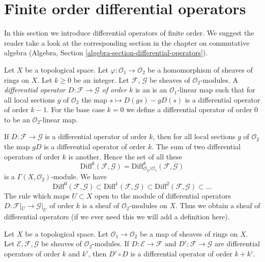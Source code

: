 \section{Finite order differential operators}
\label{section-differential-operators}

\noindent
In this section we introduce differential operators of finite order.
We suggest the reader take a look at the corresponding section
in the chapter on commutative algebra
(Algebra, Section \ref{algebra-section-differential-operators}).

\begin{definition}
\label{definition-differential-operators}
Let $X$ be a topological space. Let $\varphi : \mathcal{O}_1 \to \mathcal{O}_2$
be a homomorphism of sheaves of rings on $X$. Let $k \geq 0$ be an integer.
Let $\mathcal{F}$, $\mathcal{G}$ be sheaves of $\mathcal{O}_2$-modules.
A {\it differential operator $D : \mathcal{F} \to \mathcal{G}$ of order $k$}
is an is an $\mathcal{O}_1$-linear map such that for all local sections
$g$ of $\mathcal{O}_2$ the map $s \mapsto D(gs) - gD(s)$ is a
differential operator of order $k - 1$. For the base case $k = 0$
we define a differential operator of order $0$ to be an
$\mathcal{O}_2$-linear map.
\end{definition}

\noindent
If $D : \mathcal{F} \to \mathcal{G}$ is a differential operator of order $k$,
then for all local sections $g$ of $\mathcal{O}_2$ the map $gD$ is a
differential operator of order $k$. The sum of two differential operators of
order $k$ is another. Hence the set of all these
$$
\text{Diff}^k(\mathcal{F}, \mathcal{G}) =
\text{Diff}^k_{\mathcal{O}_2/\mathcal{O}_1}(\mathcal{F}, \mathcal{G})
$$
is a $\Gamma(X, \mathcal{O}_2)$-module. We have
$$
\text{Diff}^0(\mathcal{F}, \mathcal{G}) \subset
\text{Diff}^1(\mathcal{F}, \mathcal{G}) \subset
\text{Diff}^2(\mathcal{F}, \mathcal{G}) \subset \ldots
$$
The rule which maps $U \subset X$ open to the module of
differential operators $D : \mathcal{F}|_U \to \mathcal{G}|_U$
of order $k$ is a sheaf of $\mathcal{O}_2$-modules on $X$.
Thus we obtain a sheaf of differential operators (if we ever need this we will
add a definition here).

\begin{lemma}
\label{lemma-composition-differential-operators}
Let $X$ be a topological space.
Let $\mathcal{O}_1 \to \mathcal{O}_2$ be a map of sheaves of rings on $X$.
Let $\mathcal{E}, \mathcal{F}, \mathcal{G}$ be sheaves of
$\mathcal{O}_2$-modules.
If $D : \mathcal{E} \to \mathcal{F}$ and $D' : \mathcal{F} \to \mathcal{G}$
are differential operators of order $k$ and $k'$, then $D' \circ D$ is a
differential operator of order $k + k'$.
\end{lemma}

